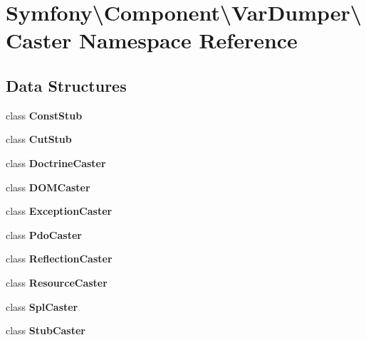 \section{Symfony\textbackslash{}Component\textbackslash{}Var\+Dumper\textbackslash{}Caster Namespace Reference}
\label{namespace_symfony_1_1_component_1_1_var_dumper_1_1_caster}
\subsection*{Data Structures}
\begin{DoxyCompactItemize}
\item 
class {\bf Const\+Stub}
\item 
class {\bf Cut\+Stub}
\item 
class {\bf Doctrine\+Caster}
\item 
class {\bf D\+O\+M\+Caster}
\item 
class {\bf Exception\+Caster}
\item 
class {\bf Pdo\+Caster}
\item 
class {\bf Reflection\+Caster}
\item 
class {\bf Resource\+Caster}
\item 
class {\bf Spl\+Caster}
\item 
class {\bf Stub\+Caster}
\end{DoxyCompactItemize}
